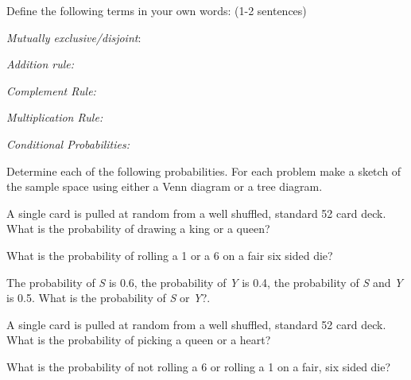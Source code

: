  
 
\begin{problem}
  \item Define the following terms in your own words: (1-2 sentences) 

    \begin{subproblem}
      \item \textit{Mutually exclusive/disjoint}: 
        \vfill
      \item \textit{Addition rule:} 
        \vfill
      \item \textit{Complement Rule:} 
        \vfill
      \item \textit{Multiplication Rule:} 
        \vfill
      \item \textit{Conditional Probabilities:}  
        \vfill
    \end{subproblem}

  \item Determine each of the following probabilities. For each
    problem make a sketch of the sample space using either a Venn
    diagram or a tree diagram.

  \begin{subproblem}

  \item A single card is pulled at random from a well shuffled,
    standard 52 card deck. What is the probability of drawing a king
    or a queen?

    \vfill
    \vfill

    \clearpage

  \item What is the probability of rolling a 1 or a 6 on a fair six
    sided die?

    \vfill

  \item The probability of \textit{S} is 0.6, the probability of
    \textit{Y} is 0.4, the probability of \textit{S} and \textit{Y} is
    0.5. What is the probability of \textit{S} or \textit{Y}?.

    \vfill

  \item A single card is pulled at random from a well shuffled,
    standard 52 card deck. What is the probability of picking a queen
    or a heart?

    \vfill

  \item What is the probability of not rolling a 6 or rolling a 1 on a
    fair, six sided die?


\end{subproblem}
\end{problem}

